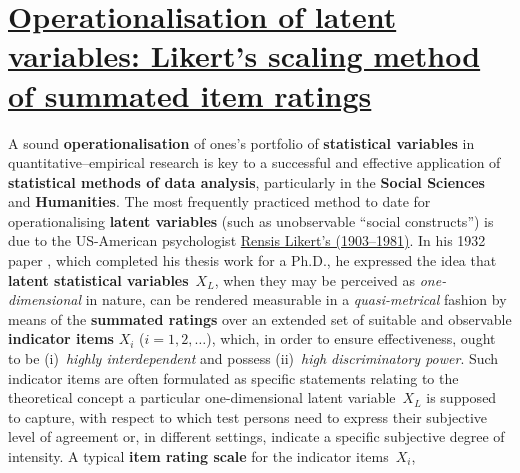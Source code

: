 \chapter[Likert's scaling method of summated item 
ratings]{\href{https://www.youtube.com/watch?v=_IJJ_D6UOaQ}{Operationalisation 
of latent variables: Likert's scaling method of summated item
ratings}}
A sound \textbf{operationalisation} of ones's portfolio of
\textbf{statistical variables} in quantitative--empirical research
is key to a successful and effective application of
\textbf{statistical methods of data analysis}, particularly in the
\textbf{Social Sciences} and \textbf{Humanities}. The most
frequently practiced method to date for operationalising
\textbf{latent variables} (such as unobservable ``social
constructs'') is due to the US-American psychologist 
\href{http://en.wikipedia.org/wiki/Rensis_Likert}{Rensis Likert's 
(1903--1981)}. In his 1932 paper , which completed his 
thesis work for a Ph.D., he expressed the idea that \textbf{latent 
statistical variables}~$X_{L}$, when they may be perceived as 
\textit{one-dimensional} in nature, can be rendered measurable in a 
\textit{quasi-metrical} fashion by means of the \textbf{summated 
ratings} over an extended set of suitable and observable
\textbf{indicator items} $X_{i}$ ($i=1,2,\ldots$), which, in order
to ensure effectiveness, ought to be (i)~\textit{highly
interdependent} and possess (ii)~\textit{high discriminatory
power}. Such indicator items are often formulated as specific
statements relating to the theoretical concept a particular
one-dimensional latent variable~$X_{L}$ is supposed to capture,
with respect to which test persons need to express their subjective
level of agreement or, in different settings, indicate a specific
subjective degree of intensity. A typical \textbf{item rating
scale} for the indicator items~$X_{i}$, 
